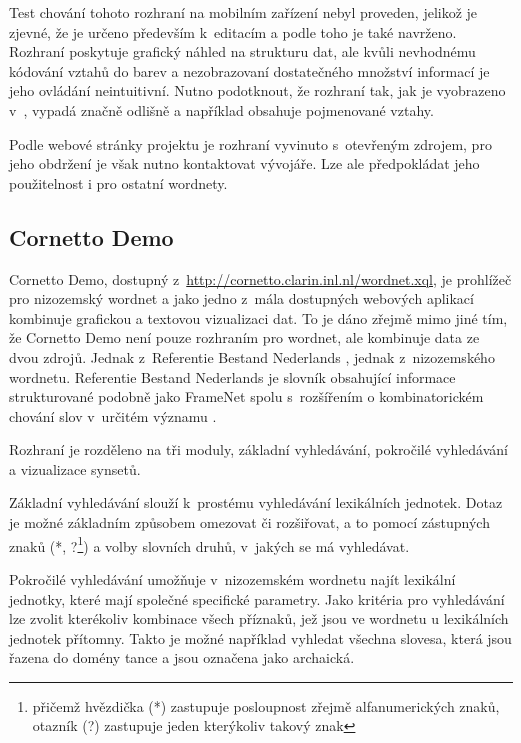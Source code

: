 \documentclass[a4paper, 11pt, oneside, showtrims]{book}
\newcommand\ex{\textsf}
\begin{document}
					Test chování tohoto rozhraní na mobilním zařízení nebyl proveden, jelikož je zjevné, že je určeno především k~editacím a podle toho je také navrženo. Rozhraní poskytuje grafický náhled na strukturu dat, ale kvůli nevhodnému kódování vztahů do barev a nezobrazovaní dostatečného množství informací je jeho ovládání neintuitivní. Nutno podotknout, že rozhraní tak, jak je vyobrazeno v~\textcite{szymanski2007cooperative}, vypadá značně odlišně a například obsahuje pojmenované vztahy.

					Podle webové stránky projektu \textcite{wordnetsolution2007web} je rozhraní vyvinuto s~otevřeným zdrojem, pro jeho obdržení je však nutno kontaktovat vývojáře. Lze ale předpokládat jeho použitelnost i pro ostatní wordnety.

				\subsection{Cornetto Demo}
				\label{wnvis:cornetto}

					Cornetto Demo, dostupný z~\url{http://cornetto.clarin.inl.nl/wordnet.xql}, je prohlížeč pro nizozemský wordnet a jako jedno z~mála dostupných webových aplikací kombinuje grafickou a textovou vizualizaci dat. To je dáno zřejmě mimo jiné tím, že Cornetto Demo není pouze rozhraním pro wordnet, ale kombinuje data ze dvou zdrojů. Jednak z~Referentie Bestand Nederlands \parencite{martin2005referentie}, jednak z~nizozemského wordnetu. Referentie Bestand Nederlands je slovník obsahující informace strukturované podobně jako FrameNet \parencite{fillmore2004framenet} spolu s~rozšířením o kombinatorickém chování slov v~určitém významu \parencite{horak2008development}. 

					Rozhraní je rozděleno na tři moduly, základní vyhledávání, pokročilé vyhledávání a vizualizace synsetů. 

					Základní vyhledávání slouží k~prostému vyhledávání lexikálních jednotek. Dotaz je možné základním způsobem omezovat či rozšiřovat, a to pomocí zástupných znaků (\ex{*}, \ex{?}\footnote{přičemž hvězdička (\ex{*}) zastupuje posloupnost zřejmě alfanumerických znaků, otazník (\ex{?}) zastupuje jeden kterýkoliv takový znak}) a volby slovních druhů, v~jakých se má vyhledávat. \parencite{cornettoGettingStarted}

					Pokročilé vyhledávání umožňuje v~nizozemském wordnetu najít lexikální jednotky, které mají společné specifické parametry. Jako kritéria pro vyhledávání lze zvolit kterékoliv kombinace všech příznaků, jež jsou ve wordnetu u lexikálních jednotek přítomny. Takto je možné například vyhledat všechna slovesa, která jsou řazena do domény tance a jsou označena jako archaická.  
\end{document}
